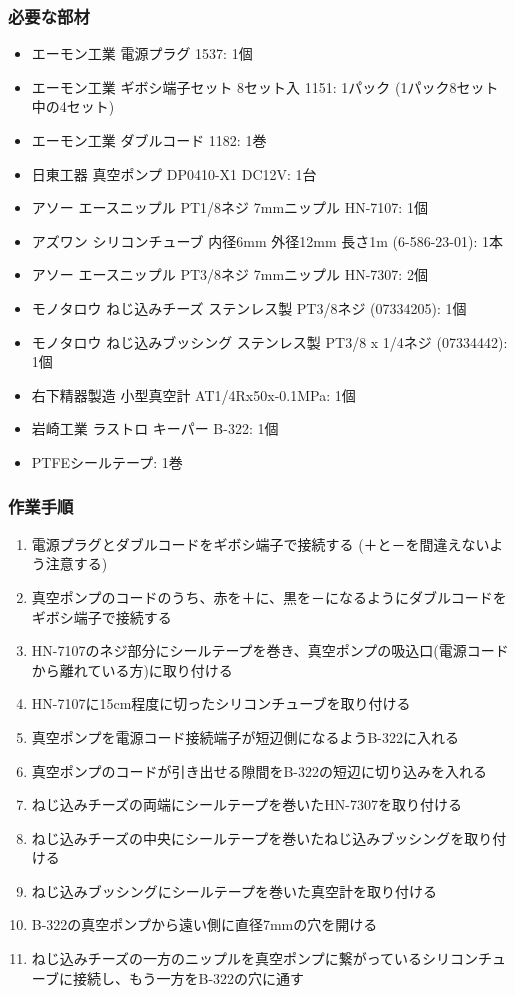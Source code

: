 \documentclass[titlepage,10pt,a4paper]{jsbook}
\begin{document}
\subsubsection{必要な部材}
\begin{itemize}
\item エーモン工業 電源プラグ 1537: 1個
\item エーモン工業 ギボシ端子セット 8セット入 1151: 1パック (1パック8セット中の4セット)
\item エーモン工業 ダブルコード 1182: 1巻
\item 日東工器 真空ポンプ DP0410-X1 DC12V: 1台
\item アソー エースニップル PT1/8ネジ 7mmニップル HN-7107: 1個
\item アズワン シリコンチューブ 内径6mm 外径12mm 長さ1m (6-586-23-01): 1本
\item アソー エースニップル PT3/8ネジ 7mmニップル HN-7307: 2個
\item モノタロウ ねじ込みチーズ ステンレス製 PT3/8ネジ (07334205): 1個
\item モノタロウ ねじ込みブッシング ステンレス製 PT3/8 x 1/4ネジ (07334442): 1個
\item 右下精器製造 小型真空計 AT1/4Rx50x-0.1MPa: 1個
\item 岩崎工業 ラストロ キーパー B-322: 1個
\item PTFEシールテープ: 1巻
\end{itemize}

\subsubsection{作業手順}
\begin{enumerate}
\item 電源プラグとダブルコードをギボシ端子で接続する (＋と－を間違えないよう注意する)
\item 真空ポンプのコードのうち、赤を＋に、黒を－になるようにダブルコードをギボシ端子で接続する
\item HN-7107のネジ部分にシールテープを巻き、真空ポンプの吸込口(電源コードから離れている方)に取り付ける
\item HN-7107に15cm程度に切ったシリコンチューブを取り付ける
\item 真空ポンプを電源コード接続端子が短辺側になるようB-322に入れる
\item 真空ポンプのコードが引き出せる隙間をB-322の短辺に切り込みを入れる
\item ねじ込みチーズの両端にシールテープを巻いたHN-7307を取り付ける
\item ねじ込みチーズの中央にシールテープを巻いたねじ込みブッシングを取り付ける
\item ねじ込みブッシングにシールテープを巻いた真空計を取り付ける
\item B-322の真空ポンプから遠い側に直径7mmの穴を開ける
\item ねじ込みチーズの一方のニップルを真空ポンプに繋がっているシリコンチューブに接続し、もう一方をB-322の穴に通す
\end{enumerate}
\end{document}
